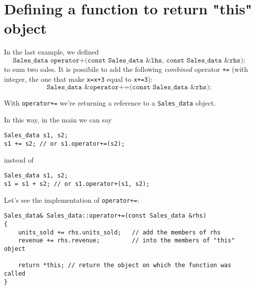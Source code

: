 
\section{Defining a function to return "this" object} %
\label{sec:defining_a_function_to_return_this_object}

In the last example, we defined
\begin{equation*}
\texttt{Sales\_data operator+(const Sales\_data \& lhs, const Sales\_data \& rhs);}
\end{equation*}
to sum two sales. It is possibile to add the following \emph{combined} operator \texttt{+=} (with integer, the one that make \texttt{x=x+3} equal to \texttt{x+=3}):
\begin{equation*}
\texttt{Sales\_data \& operator+=(const Sales\_data \& rhs);}
\end{equation*}

With \texttt{operator+=} we're returning a reference to a \texttt{Sales\_data} object.

In this way, in the main we can say
\begin{lstlisting}
Sales_data s1, s2;
s1 += s2; // or s1.operator+=(s2);
\end{lstlisting}

instead of
\begin{lstlisting}
Sales_data s1, s2;
s1 = s1 + s2; // or s1.operator+(s1, s2);
\end{lstlisting}

Let's see the implementation of \texttt{operator+=}:
\begin{lstlisting}
Sales_data& Sales_data::operator+=(const Sales_data &rhs) 
{
    units_sold += rhs.units_sold;   // add the members of rhs 
    revenue += rhs.revenue;         // into the members of "this" object

    return *this; // return the object on which the function was called
}
\end{lstlisting}

